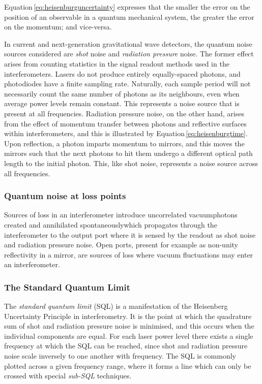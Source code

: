Equation\,\ref{eq:heisenburguncertainty} expresses that the smaller the error on the position of an observable in a quantum mechanical system, the greater the error on the momentum; and vice-versa.

In current and next-generation gravitational wave detectors, the quantum noise sources considered are \emph{shot} noise and \emph{radiation pressure} noise. The former effect arises from counting statistics in the signal readout methods used in the interferometers. Lasers do not produce entirely equally-spaced photons, and photodiodes have a finite sampling rate. Naturally, each sample period will not necessarily count the same number of photons as its neighbours, even when average power levels remain constant. This represents a noise source that is present at all frequencies. Radiation pressure noise, on the other hand, arises from the effect of momentum transfer between photons and reflective surfaces within interferometers, and this is illustrated by Equation\,\ref{eq:heisenburgtime}. Upon reflection, a photon imparts momentum to mirrors, and this moves the mirrors such that the next photons to hit them undergo a different optical path length to the initial photon. This, like shot noise, represents a noise source across all frequencies.

\subsubsection{Quantum noise at loss points}
Sources of loss in an interferometer introduce uncorrelated vacuum\textendash photons created and annihilated spontaneously\textendash which propagates through the interferometer to the output port where it is sensed by the readout as shot noise and radiation pressure noise. Open ports, present for example as non-unity reflectivity in a mirror, are sources of loss where vacuum fluctuations may enter an interferometer.

\subsubsection{\label{sec:sql}The Standard Quantum Limit}
The \emph{standard quantum limit} (\gls{SQL}) is a manifestation of the Heisenberg Uncertainty Principle in interferometry. It is the point at which the quadrature sum of shot and radiation pressure noise is minimised, and this occurs when the individual components are equal. For each laser power level there exists a single frequency at which the \gls{SQL} can be reached, since shot and radiation pressure noise scale inversely to one another with frequency. The \gls{SQL} is commonly plotted across a given frequency range, where it forms a line which can only be crossed with special \emph{sub-\gls{SQL}} techniques.

